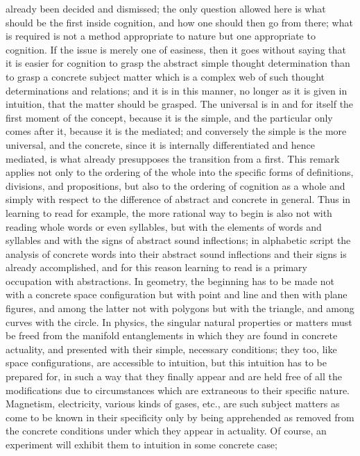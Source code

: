 already been decided and dismissed;
the only question allowed here is
what should be the first inside cognition,
and how one should then go from there;
what is required is not a method appropriate to nature
but one appropriate to cognition.
If the issue is merely one of easiness,
then it goes without saying that
it is easier for cognition to grasp
the abstract simple thought determination
than to grasp a concrete subject matter
which is a complex web of such thought
determinations and relations;
and it is in this manner,
no longer as it is given in intuition,
that the matter should be grasped.
The universal is in and for itself
the first moment of the concept,
because it is the simple,
and the particular only comes after it,
because it is the mediated;
and conversely the simple is the more universal,
and the concrete,
since it is internally differentiated
and hence mediated,
is what already presupposes the transition from a first.
This remark applies not only to the ordering
of the whole into the specific forms of
definitions, divisions, and propositions,
but also to the ordering of cognition as a whole
and simply with respect to the difference of
abstract and concrete in general.
Thus in learning to read for example,
the more rational way to begin is also not
with reading whole words or even syllables,
but with the elements of words and syllables
and with the signs of abstract sound inflections;
in alphabetic script the analysis of concrete words
into their abstract sound inflections
and their signs is already accomplished,
and for this reason learning to read
is a primary occupation with abstractions.
In geometry, the beginning has to be made
not with a concrete space configuration
but with point and line
and then with plane figures,
and among the latter not with polygons but
with the triangle, and among curves with the circle.
In physics, the singular natural properties or matters
must be freed from the manifold entanglements
in which they are found in concrete actuality,
and presented with their simple, necessary conditions;
they too, like space configurations,
are accessible to intuition,
but this intuition has to be prepared for,
in such a way that they finally appear
and are held free of all the modifications
due to circumstances which are extraneous
to their specific nature.
Magnetism, electricity, various kinds of gases, etc.,
are such subject matters as come to be known
in their specificity only by being apprehended
as removed from the concrete conditions
under which they appear in actuality.
Of course, an experiment will exhibit them
to intuition in some concrete case;
